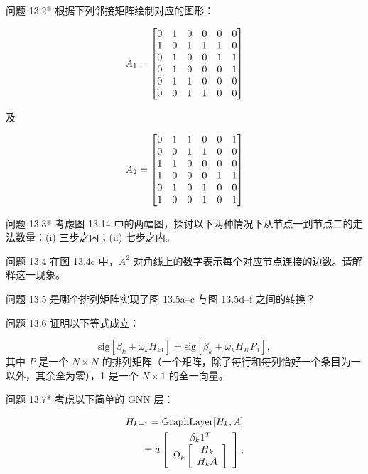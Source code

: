 问题 13.2* 根据下列邻接矩阵绘制对应的图形：

\begin{equation}
A_1 =
\begin{bmatrix}
0 & 1 & 0 & 0 & 0 & 0 \\
1 & 0 & 1 & 1 & 1 & 0 \\
0 & 1 & 0 & 0 & 1 & 1 \\
0 & 1 & 0 & 0 & 0 & 1 \\
0 & 1 & 1 & 0 & 0 & 0 \\
0 & 0 & 1 & 1 & 0 & 0  \notag \\
\end{bmatrix}
\end{equation}

及

\begin{equation}
A_2 =
\begin{bmatrix}
0 & 1 & 1 & 0 & 0 & 1 \\
0 & 0 & 1 & 1 & 0 & 0 \\
1 & 1 & 0 & 0 & 0 & 0 \\
1 & 0 & 0 & 0 & 1 & 1 \\
0 & 1 & 0 & 1 & 0 & 0 \\
1 & 0 & 0 & 1 & 0 & 1 \notag \\
\end{bmatrix}
\end{equation}

问题 13.3* 考虑图 13.14 中的两幅图，探讨以下两种情况下从节点一到节点二的走法数量：(i) 三步之内；(ii) 七步之内。

问题 13.4 在图 13.4c 中，\(A^2\) 对角线上的数字表示每个对应节点连接的边数。请解释这一现象。

问题 13.5 是哪个排列矩阵实现了图 13.5a–c 与图 13.5d–f 之间的转换？

问题 13.6 证明以下等式成立：

\begin{equation}
\text{sig}[\beta_k + \omega_k H_{k1}] = \text{sig}[\beta_k + \omega_k H_K P_{1}], 
\end{equation}
其中 \(P\) 是一个 \(N \times N\) 的排列矩阵（一个矩阵，除了每行和每列恰好一个条目为一以外，其余全为零），1 是一个 \(N \times 1\) 的全一向量。

问题 13.7* 考虑以下简单的 GNN 层：


\begin{align}
H_{k+1} = \text{GraphLayer}[H_k, A] \notag \\
= a \left[
\begin{array}{c}
\beta_k 1^T  \\
\Omega_k \left[ \begin{array}{c}
H_k  \\
H_k A \\
\end{array} \right]
\end{array}
\right], 
\end{align} 


